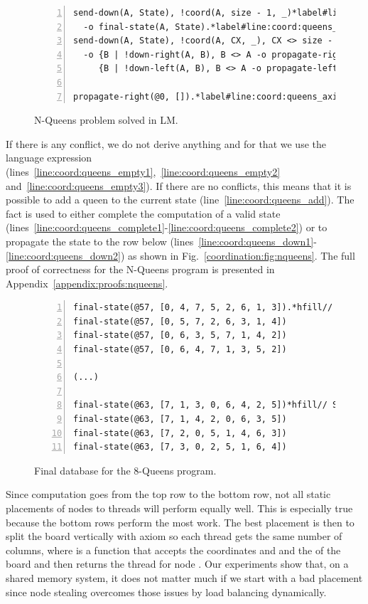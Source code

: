 \begin{figure}[h!]
\begin{Verbatim}[numbers=left,fontsize=\scriptsize,commandchars=\*\#\&]
send-down(A, State), !coord(A, size - 1, _)*label#line:coord:queens_complete1&*hfill// Rule 13: final state
  -o final-state(A, State).*label#line:coord:queens_complete2&
send-down(A, State), !coord(A, CX, _), CX <> size - 1*label#line:coord:queens_down1&*hfill// Rule 14: propagate the state down
  -o {B | !down-right(A, B), B <> A -o propagate-right(B, State)},
     {B | !down-left(A, B), B <> A -o propagate-left(B, State)}.*label#line:coord:queens_down2&

propagate-right(@0, []).*label#line:coord:queens_axiom&*hfill// Initial fact
\end{Verbatim}
  \caption{N-Queens problem solved in LM.}
  \label{code:coordination:nqueens}
\end{figure}

If there is any conflict, we do not derive anything and for that we use the
language expression 
(lines~\ref{line:coord:queens_empty1},~\ref{line:coord:queens_empty2}
and~\ref{line:coord:queens_empty3}). If there are no conflicts, this means that
it is possible to add a queen to the current state
(line~\ref{line:coord:queens_add}). The fact  is used to either
complete the computation of a valid state
(lines~\ref{line:coord:queens_complete1}-\ref{line:coord:queens_complete2}) or
to propagate the state to the row below
(lines~\ref{line:coord:queens_down1}-\ref{line:coord:queens_down2}) as shown in
Fig.~\ref{coordination:fig:nqueens}.
The full proof of correctness for
the N-Queens program is presented in Appendix~\ref{appendix:proofs:nqueens}.

\begin{figure}[h!]
\begin{Verbatim}[numbers=left,fontsize=\codesize,commandchars=\*\#\&]
final-state(@57, [0, 4, 7, 5, 2, 6, 1, 3]).*hfill// States at square (7, 0)
final-state(@57, [0, 5, 7, 2, 6, 3, 1, 4])
final-state(@57, [0, 6, 3, 5, 7, 1, 4, 2])
final-state(@57, [0, 6, 4, 7, 1, 3, 5, 2])

(...)

final-state(@63, [7, 1, 3, 0, 6, 4, 2, 5])*hfill// States at square (7, 7)
final-state(@63, [7, 1, 4, 2, 0, 6, 3, 5])
final-state(@63, [7, 2, 0, 5, 1, 4, 6, 3])
final-state(@63, [7, 3, 0, 2, 5, 1, 6, 4])
\end{Verbatim}
  \caption{Final database for the 8-Queens program.}
  \label{code:coordination:8queens}
\end{figure}

Since computation goes from the top row to the bottom row, not all static
placements of nodes to threads will perform equally well. This is especially
true because the bottom rows perform the most work.  The best placement is then
to split the board vertically with axiom  so each thread gets the same number of columns, where
 is a function that accepts the coordinates  and 
and the  of the board and then returns the thread for node .
Our experiments show that, on a shared memory system, it does not matter much if
we start with a bad placement since node stealing overcomes those issues by load
balancing dynamically.

